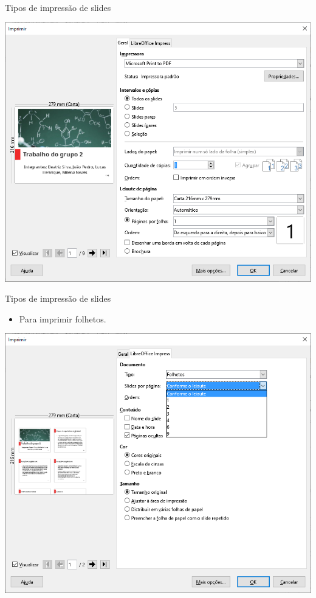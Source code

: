 \begin{frame}{Tipos de impressão de slides}

	\centering
	\includegraphics[width=0.75\linewidth]{Figuras/Ch05/fig22}
\end{frame}


\begin{frame}{Tipos de impressão de slides}
	\begin{block}{}
		\begin{itemize}
			\item Para imprimir folhetos.
		\end{itemize}
	\end{block}

	\centering
	\includegraphics[width=0.65\linewidth]{Figuras/Ch05/fig23}
\end{frame}


